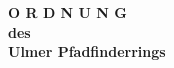 \begin{titlepage}
    \vspace*{\fill}
    \begin{center}
        \begin{Huge}
            \textbf{
                O R D N U N G \\
                \vspace{20pt}
                des\\ 
                \vspace{20pt}
                Ulmer Pfadfinderrings\\
            }
        \end{Huge}
    \end{center}
    \vspace{150pt}
    \vspace*{\fill}
\end{titlepage}
